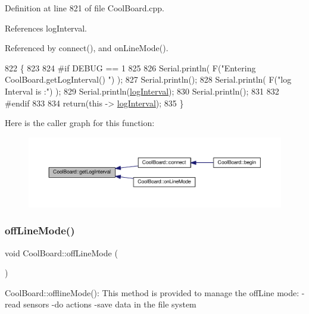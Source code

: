Definition at line 821 of file Cool\+Board.\+cpp.



References log\+Interval.



Referenced by connect(), and on\+Line\+Mode().


\begin{DoxyCode}
822 \{
823 
824 \textcolor{preprocessor}{#if DEBUG == 1}
825 
826     Serial.println( F(\textcolor{stringliteral}{"Entering CoolBoard.getLogInterval() "}) );
827     Serial.println();
828     Serial.println( F(\textcolor{stringliteral}{"log Interval is :"}) );
829     Serial.println(\hyperlink{classCoolBoard_a4de0096d575d66b472c4c1f0111fd452}{logInterval});
830     Serial.println();
831 
832 \textcolor{preprocessor}{#endif}
833 
834     \textcolor{keywordflow}{return}(\textcolor{keyword}{this} -> \hyperlink{classCoolBoard_a4de0096d575d66b472c4c1f0111fd452}{logInterval});
835 \}
\end{DoxyCode}
Here is the caller graph for this function\+:
\nopagebreak
\begin{figure}[H]
\begin{center}
\leavevmode
\includegraphics[width=350pt]{classCoolBoard_aaa24480b273fc095a1356a589c333781_icgraph}
\end{center}
\end{figure}
\mbox{\label{classCoolBoard_ae6b5e1274d760462290192acea4adca8}} 
\subsubsection{\texorpdfstring{off\+Line\+Mode()}{offLineMode()}}
{\footnotesize\ttfamily void Cool\+Board\+::off\+Line\+Mode (\begin{DoxyParamCaption}{ }\end{DoxyParamCaption})}

Cool\+Board\+::offline\+Mode()\+: This method is provided to manage the off\+Line mode\+: -\/read sensors -\/do actions -\/save data in the file system 

